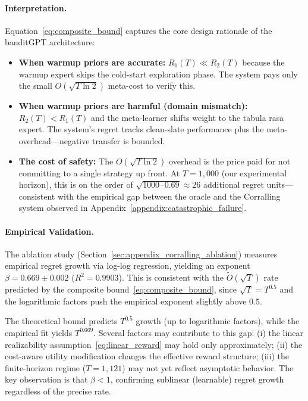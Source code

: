 \paragraph{Interpretation.}
Equation~\eqref{eq:composite_bound} captures the core design rationale of the
banditGPT architecture:

\begin{itemize}[leftmargin=*,noitemsep]
    \item \textbf{When warmup priors are accurate:} $R_1(T) \ll R_2(T)$
    because the warmup expert skips the cold-start exploration phase.  The
    system pays only the small $O(\sqrt{T \ln 2})$ meta-cost to verify this.
    
    \item \textbf{When warmup priors are harmful (domain mismatch):}
    $R_2(T) < R_1(T)$ and the meta-learner shifts weight to the tabula rasa
    expert.  The system's regret tracks clean-slate performance plus the
    meta-overhead---negative transfer is bounded.
    
    \item \textbf{The cost of safety:}
    The $O(\sqrt{T \ln 2})$ overhead is the price paid for not committing to a
    single strategy up front.  At $T = 1{,}000$ (our experimental horizon),
    this is on the order of $\sqrt{1000 \cdot 0.69} \approx 26$ additional
    regret units---consistent with the empirical gap between the oracle and the
    Corralling system observed in Appendix~\ref{appendix:catastrophic_failure}.
\end{itemize}

\paragraph{Empirical Validation.}
The ablation study (Section~\ref{sec:appendix_corralling_ablation}) measures
empirical regret growth via log-log regression, yielding an exponent
$\beta = 0.669 \pm 0.002$ ($R^2 = 0.9903$).  This is consistent with the
$\tilde{O}(\sqrt{T})$ rate predicted by the composite
bound~\eqref{eq:composite_bound}, since $\sqrt{T} = T^{0.5}$ and the
logarithmic factors push the empirical exponent slightly above $0.5$.

\begin{remark}
\label{remark:exponent_gap}
The theoretical bound predicts $T^{0.5}$ growth (up to logarithmic factors),
while the empirical fit yields $T^{0.669}$.  Several factors may contribute to
this gap: (i) the linear realizability assumption~\eqref{eq:linear_reward} may
hold only approximately; (ii) the cost-aware utility modification changes the
effective reward structure; (iii) the finite-horizon regime ($T = 1{,}121$) may
not yet reflect asymptotic behavior.  The key observation is that
$\beta < 1$, confirming sublinear (learnable) regret growth regardless of the
precise rate.
\end{remark}
